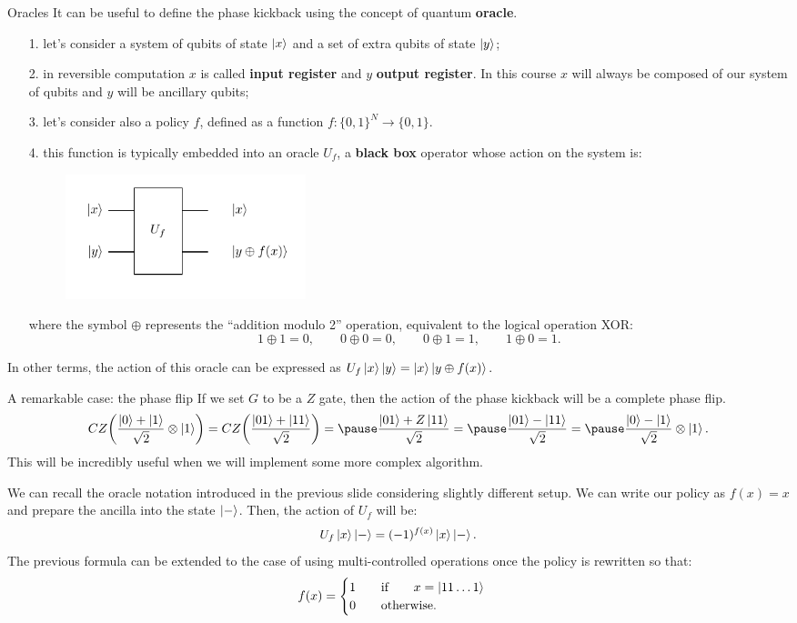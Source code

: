 \documentclass[aspectratio=169, 8pt, xcolor={svgnames}, hyperref={linkcolor=black}]{beamer}
\begin{document}
\begin{frame}{Oracles}
It can be useful to define the phase kickback using the concept of quantum \textbf{oracle}.

\begin{itemize}[noitemsep]
\item[1.] let's consider a system of qubits of state $\ket{x}$ and a set of extra qubits of state $\ket{y}$; \pause
\item[2.] in reversible computation $x$ is called \textbf{input register} and $y$ \textbf{output register}. In this 
course $x$ will always be composed of our system of qubits and $y$ will be ancillary qubits; \pause
\item[3.] let's consider also a policy $f$, defined as a function $f:\{0,1\}^{N}\to\{0,1\}$. \pause
\item[4.] this function is typically embedded into an 
oracle $U_f$, a \textbf{black box} operator whose action on the system is:
\begin{figure}
   \includegraphics[width=0.35\textwidth]{figures/oracle.pdf}
\end{figure}
where the symbol $\oplus$ represents the ``addition modulo 2'' operation, equivalent to 
the logical operation XOR: 
$$ 1\oplus1=0, \qquad 0\oplus0=0, \qquad 0\oplus1=1, \qquad 1\oplus0=1. $$
\pause
\end{itemize}
In other terms, the action of this oracle can be expressed as $U_f\ket{x}\ket{y}=\ket{x}\ket{y\oplus f(x)}.$
\end{frame}

\begin{frame}{A remarkable case: the phase flip}
If we set $G$ to be a $Z$ gate, then the action of the phase kickback will be 
a complete phase flip.
$$ CZ \biggl( \frac{\ket{0}+\ket{1}}{\sqrt{2}} \otimes \ket{1} \biggr)  = 
CZ \biggl( \frac{\ket{01}+\ket{11}}{\sqrt{2}} \biggr) = \pause
\frac{\ket{01}+Z\ket{11}}{\sqrt{2}} = \pause
\frac{\ket{01}- \ket{11}}{\sqrt{2}} = \pause
\frac{\ket{0}- \ket{1}}{\sqrt{2}} \otimes \ket{1}.
$$ 
This will be incredibly useful when we will implement some more complex algorithm. \pause

We can recall the oracle notation introduced in the previous slide considering slightly different setup. 
We can write our policy as $f(x)=x$ and prepare the ancilla into the state $\ket{-}$. Then,
the action of $U_f$ will be:
$$ U_f \ket{x} \ket{-} = (-1)^{f(x)}\ket{x}\ket{-}. $$
\pause
The previous formula can be extended to the case of using multi-controlled operations 
once the policy is rewritten so that:
$$ f(x) = \begin{cases}
1 \qquad \text{if} \qquad x=\ket{11\dots 1} \\
0 \qquad \text{otherwise}.
\end{cases} $$

\end{frame}
\end{document}
